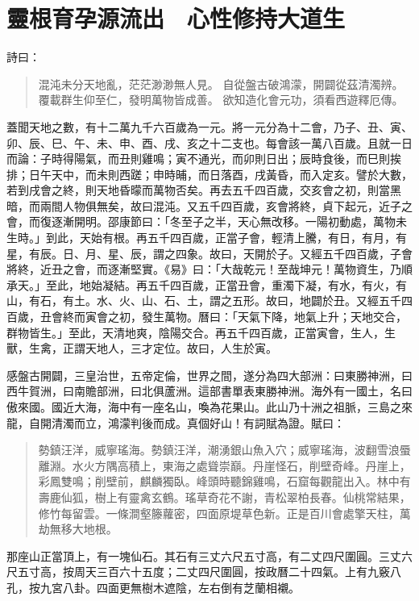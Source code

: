 
\chapter{靈根育孕源流出　心性修持大道生}

詩曰：
\begin{quote}
混沌未分天地亂，茫茫渺渺無人見。
自從盤古破鴻濛，開闢從茲清濁辨。
覆載群生仰至仁，發明萬物皆成善。
欲知造化會元功，須看西遊釋厄傳。
\end{quote}

蓋聞天地之數，有十二萬九千六百歲為一元。將一元分為十二會，乃子、丑、寅、卯、辰、巳、午、未、申、酉、戌、亥之十二支也。每會該一萬八百歲。且就一日而論：子時得陽氣，而丑則雞鳴；寅不通光，而卯則日出；辰時食後，而巳則挨排；日午天中，而未則西蹉；申時晡，而日落酉，戌黃昏，而入定亥。譬於大數，若到戌會之終，則天地昏曚而萬物否矣。再去五千四百歲，交亥會之初，則當黑暗，而兩間人物俱無矣，故曰混沌。又五千四百歲，亥會將終，貞下起元，近子之會，而復逐漸開明。邵康節曰：「冬至子之半，天心無改移。一陽初動處，萬物未生時。」到此，天始有根。再五千四百歲，正當子會，輕清上騰，有日，有月，有星，有辰。日、月、星、辰，謂之四象。故曰，天開於子。又經五千四百歲，子會將終，近丑之會，而逐漸堅實。《易》曰：「大哉乾元！至哉坤元！萬物資生，乃順承天。」至此，地始凝結。再五千四百歲，正當丑會，重濁下凝，有水，有火，有山，有石，有土。水、火、山、石、土，謂之五形。故曰，地闢於丑。又經五千四百歲，丑會終而寅會之初，發生萬物。曆曰：「天氣下降，地氣上升；天地交合，群物皆生。」至此，天清地爽，陰陽交合。再五千四百歲，正當寅會，生人，生獸，生禽，正謂天地人，三才定位。故曰，人生於寅。

感盤古開闢，三皇治世，五帝定倫，世界之間，遂分為四大部洲：曰東勝神洲，曰西牛賀洲，曰南贍部洲，曰北俱蘆洲。這部書單表東勝神洲。海外有一國土，名曰傲來國。國近大海，海中有一座名山，喚為花果山。此山乃十洲之祖脈，三島之來龍，自開清濁而立，鴻濛判後而成。真個好山！有詞賦為證。賦曰：
\begin{quote}
勢鎮汪洋，威寧瑤海。勢鎮汪洋，潮湧銀山魚入穴；威寧瑤海，波翻雪浪蜃離淵。水火方隅高積上，東海之處聳崇巔。丹崖怪石，削壁奇峰。丹崖上，彩鳳雙鳴；削壁前，麒麟獨臥。峰頭時聽錦雞鳴，石窟每觀龍出入。林中有壽鹿仙狐，樹上有靈禽玄鶴。瑤草奇花不謝，青松翠柏長春。仙桃常結果，修竹每留雲。一條澗壑籐蘿密，四面原堤草色新。正是百川會處擎天柱，萬劫無移大地根。
\end{quote}

那座山正當頂上，有一塊仙石。其石有三丈六尺五寸高，有二丈四尺圍圓。三丈六尺五寸高，按周天三百六十五度；二丈四尺圍圓，按政曆二十四氣。上有九竅八孔，按九宮八卦。四面更無樹木遮陰，左右倒有芝蘭相襯。

